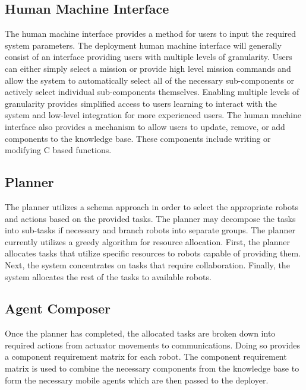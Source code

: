    \subsection{Human Machine Interface}
      The human machine interface provides a method for users to input the 
        required system parameters.
      The deployment human machine interface will generally consist of an 
        interface providing users with multiple levels of granularity.
      Users can either simply select a mission or provide high level mission
        commands and allow the system to automatically select all of the
        necessary sub-components or actively select individual sub-components
        themselves.
      Enabling multiple levels of granularity provides simplified access to 
        users learning to interact with the system and low-level integration
        for more experienced users.
      The human machine interface also provides a mechanism to allow users to
        update, remove, or add components to the knowledge base.
      These components include writing or modifying C based functions.

    \subsection{Planner}
      The planner utilizes a schema approach in order to select the
        appropriate robots and actions based on the provided tasks.
      The planner may decompose the tasks into sub-tasks if necessary and
        branch robots into separate groups.
      The planner currently utilizes a greedy algorithm for resource allocation.
      First, the planner allocates tasks that utilize specific resources to
        robots capable of providing them.
      Next, the system concentrates on tasks that require collaboration.
      Finally, the system allocates the rest of the tasks to available
        robots.

    \subsection{Agent Composer}
      Once the planner has completed, the allocated tasks are broken down
        into required actions from actuator movements to communications.
      Doing so provides a component requirement matrix for each robot.
      The component requirement matrix is used to combine the necessary
        components from the knowledge base to form the necessary mobile
        agents which are then passed to the deployer.

